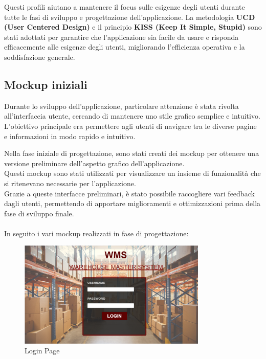 Questi profili aiutano a mantenere il focus sulle esigenze degli utenti durante tutte le fasi di sviluppo e progettazione dell'applicazione. La metodologia \textbf{UCD (User Centered Design)} e il principio \textbf{KISS (Keep It Simple, Stupid)} sono stati adottati per garantire che l'applicazione sia facile da usare e risponda efficacemente alle esigenze degli utenti, migliorando l'efficienza operativa e la soddisfazione generale.

\newpage
\subsection{Mockup iniziali}

Durante lo sviluppo dell'applicazione, particolare attenzione è stata rivolta all'interfaccia utente,
cercando di mantenere uno stile grafico semplice e intuitivo.\\ L'obiettivo principale era permettere agli utenti di
navigare tra le diverse pagine e informazioni in modo rapido e intuitivo.

Nella fase iniziale di progettazione, sono stati creati dei mockup per ottenere una versione preliminare dell'aspetto
grafico dell'applicazione.\\ Questi mockup sono stati utilizzati per visualizzare un insieme di funzionalità che si
ritenevano necessarie per l'applicazione.\\ Grazie a queste interfacce preliminari, è stato possibile raccogliere vari
feedback dagli utenti, permettendo di apportare miglioramenti e ottimizzazioni prima della fase di sviluppo finale.\\
\\In seguito i vari mockup realizzati in fase di progettazione:

\begin{figure}[H]
    \centering
    \includegraphics[width=0.8\textwidth]{document/sections/img/login.png}
    \caption{Login Page}
    \label{fig:login}
\end{figure}

